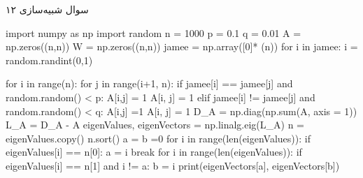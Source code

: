 سوال شبیه‌سازی ۱۲

\begin{latin}
\begin{python}
import numpy as np
import random
n = 1000
p = 0.1
q = 0.01
A = np.zeros((n,n))
W = np.zeros((n,n))
jamee = np.array([0]* (n))
for i in jamee:
    i = random.randint(0,1)

for i in range(n):
    for j in range(i+1, n):
        if jamee[i] == jamee[j] and random.random() < p:
            A[i,j] = 1
            A[i, j] = 1
        elif jamee[i] != jamee[j] and random.random() < q:
            A[i,j] =1
            A[i, j] = 1
D_A = np.diag(np.sum(A, axis = 1))
L_A = D_A - A
eigenValues, eigenVectors = np.linalg.eig(L_A)
n = eigenValues.copy()
n.sort()
a = b =0
for i in range(len(eigenValues)):
    if eigenValues[i] == n[0]:
        a = i
        break
for i in range(len(eigenValues)):
    if eigenValues[i] == n[1] and i != a:
        b = i
print(eigenVectors[a], eigenVectors[b])
\end{python}
\end{latin}
